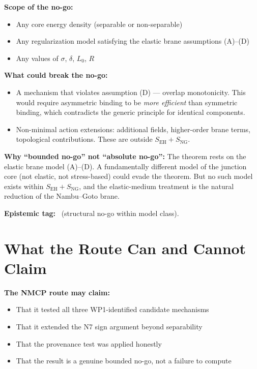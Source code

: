 \begin{resultbox}[title=NMCP WP2 Outcome: Bounded No-Go]
\textbf{Scope of the no-go:}
\begin{itemize}
    \item Any core energy density (separable or non-separable)
    \item Any regularization model satisfying the elastic brane
          assumptions (A)--(D)
    \item Any values of $\sigma$, $\delta$, $L_0$, $R$
\end{itemize}

\textbf{What could break the no-go:}
\begin{itemize}
    \item A mechanism that violates assumption (D) --- overlap
          monotonicity. This would require asymmetric binding to be
          \emph{more efficient} than symmetric binding, which contradicts
          the generic principle for identical components.
    \item Non-minimal action extensions: additional fields, higher-order
          brane terms, topological contributions. These are outside
          $S_{\mathrm{EH}} + S_{\mathrm{NG}}$.
\end{itemize}

\textbf{Why ``bounded no-go'' not ``absolute no-go'':}
The theorem rests on the elastic brane model (A)--(D). A fundamentally
different model of the junction core (not elastic, not stress-based)
could evade the theorem. But no such model exists within
$S_{\mathrm{EH}} + S_{\mathrm{NG}}$, and the elastic-medium treatment
is the natural reduction of the Nambu--Goto brane.

\textbf{Epistemic tag:} \tagDc\ (structural no-go within model class).
\end{resultbox}

\section{What the Route Can and Cannot Claim}
\label{sec:NMCP:claims}

\textbf{The NMCP route may claim:}
\begin{itemize}
    \item That it tested all three WP1-identified candidate mechanisms
    \item That it extended the N7 sign argument beyond separability
    \item That the provenance test was applied honestly
    \item That the result is a genuine bounded no-go, not a failure
          to compute
\end{itemize}

